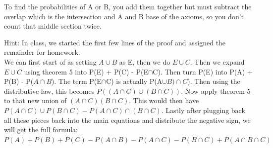 \documentclass[12pt]{article}
\begin{document}
\begin{enumerate}
To find the probabilities of A or B, you add them together but must subtract the overlap which is the intersection and A and B base of the axioms, so you don't count that middle section twice. 

Hint: In class, we started the first few lines of the proof and assigned the remainder for homework.
\\We can first start of as setting $A \cup B $ as E, then we do $E\cup C$. Then we expand $E\cup C$ using theorem 5 into P(E) + P(C) - P(E$\cap$C). Then turn P(E) into P(A) + P(B) - P($A\cap B$). The term P(E$\cap$C) is actually P(A$\cup$$B)\cap C$). Then using the distributive law, this becomes $P((A\cap C) \cup (B\cap C))$. Now apply theorem 5 to that new union of  $(A\cap C) (B\cap C)$. This would then have $P(A\cap C) \cup P(B\cap C) - P(A\cap C) \cap (B\cap C)$. Lastly after  plugging back all these pieces back into the main equations and distribute the negative sign, we will get the full formula: \\
$P(A) + P(B) + P(C)-P(A \cap B) - P(A \cap C) - P(B \cap C)+P(A \cap B \cap C)$
\end{enumerate}
\end{document}
